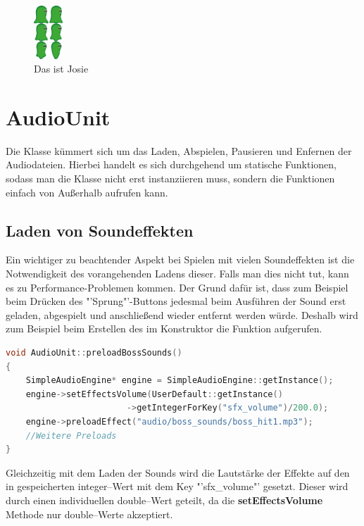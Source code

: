 \begin{figure}[H]
  \includegraphics[width=0.1\textwidth]{resources/josiejump}
  \caption{Das ist Josie}
  \label{fig:josie} 
\end{figure}

\section{AudioUnit}\label{sec:4_Audiounit}
Die Klasse  kümmert sich um das Laden, Abspielen, Pausieren und Enfernen der Audiodateien. Hierbei handelt es sich durchgehend um statische Funktionen, sodass man die Klasse nicht erst instanziieren muss, sondern die Funktionen einfach von Außerhalb aufrufen kann.

\subsection{Laden von Soundeffekten}
Ein wichtiger zu beachtender Aspekt bei Spielen mit vielen Soundeffekten ist die Notwendigkeit des vorangehenden Ladens dieser. Falls man dies nicht tut, kann es zu Performance-Problemen kommen. Der Grund dafür ist, dass zum Beispiel beim Drücken des "'Sprung"'-Buttons jedesmal beim Ausführen der Sound erst geladen, abgespielt und anschließend wieder entfernt werden würde. Deshalb wird zum Beispiel beim Erstellen des  im Konstruktor die Funktion  aufgerufen.

\begin{lstlisting}[label=lst:preloadBossSounds,
				   language=C++,
				   firstnumber=30,
				   caption=BossLevel-Sounds laden ( AudioUnit.cpp )]
void AudioUnit::preloadBossSounds()
{
	SimpleAudioEngine* engine = SimpleAudioEngine::getInstance();
	engine->setEffectsVolume(UserDefault::getInstance()
						->getIntegerForKey("sfx_volume")/200.0);
	engine->preloadEffect("audio/boss_sounds/boss_hit1.mp3");
	//Weitere Preloads
}
\end{lstlisting}

Gleichzeitig mit dem Laden der Sounds wird die Lautstärke der Effekte auf den in  gespeicherten integer--Wert mit dem Key "'sfx\_volume"' gesetzt. Dieser wird durch einen individuellen double--Wert geteilt, da die \textbf{setEffectsVolume} Methode nur double--Werte akzeptiert.

